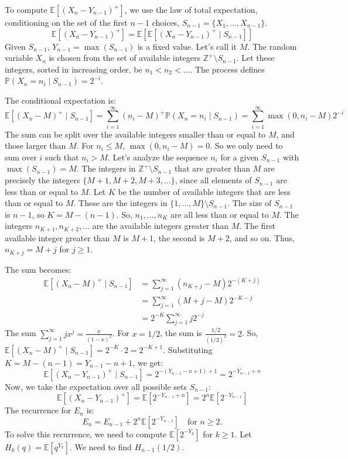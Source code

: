\documentclass[12pt,a4paper]{article}
\theoremstyle{definition}
\begin{document}
    To compute $\mathbb{E}[(X_n - Y_{n-1})^+]$, we use the law of total expectation, conditioning on the set of the first $n-1$ choices, $S_{n-1} = \{X_1, \dots, X_{n-1}\}$.
    \[ \mathbb{E}[(X_n - Y_{n-1})^+] = \mathbb{E}\left[ \mathbb{E}[(X_n - Y_{n-1})^+ \mid S_{n-1}] \right] \]
    Given $S_{n-1}$, $Y_{n-1} = \max(S_{n-1})$ is a fixed value. Let's call it $M$.
    The random variable $X_n$ is chosen from the set of available integers $\mathbb{Z}^+ \setminus S_{n-1}$. Let these integers, sorted in increasing order, be $n_1 < n_2 < \dots$. The process defines $\mathbb{P}(X_n = n_i \mid S_{n-1}) = 2^{-i}$.

    The conditional expectation is:
    \[ \mathbb{E}[(X_n - M)^+ \mid S_{n-1}] = \sum_{i=1}^{\infty} (n_i - M)^+ \mathbb{P}(X_n = n_i \mid S_{n-1}) = \sum_{i=1}^{\infty} \max(0, n_i - M) 2^{-i} \]
    The sum can be split over the available integers smaller than or equal to $M$, and those larger than $M$. For $n_i \leq M$, $\max(0, n_i-M)=0$. So we only need to sum over $i$ such that $n_i > M$.
    Let's analyze the sequence $n_i$ for a given $S_{n-1}$ with $\max(S_{n-1}) = M$. The integers in $\mathbb{Z}^+ \setminus S_{n-1}$ that are greater than $M$ are precisely the integers $\{M+1, M+2, M+3, \dots\}$, since all elements of $S_{n-1}$ are less than or equal to $M$.
    Let $K$ be the number of available integers that are less than or equal to $M$. These are the integers in $\{1, \dots, M\} \setminus S_{n-1}$. The size of $S_{n-1}$ is $n-1$, so $K = M - (n-1)$.
    So, $n_1, \dots, n_K$ are all less than or equal to $M$.
    The integers $n_{K+1}, n_{K+2}, \dots$ are the available integers greater than $M$. The first available integer greater than $M$ is $M+1$, the second is $M+2$, and so on. Thus, $n_{K+j} = M+j$ for $j \geq 1$.

    The sum becomes:
    \begin{align}
        \mathbb{E}[(X_n - M)^+ \mid S_{n-1}] &= \sum_{j=1}^{\infty} (n_{K+j} - M) 2^{-(K+j)} \\
        &= \sum_{j=1}^{\infty} (M+j - M) 2^{-K-j} \\
        &= 2^{-K} \sum_{j=1}^{\infty} j 2^{-j}
    \end{align}
    The sum $\sum_{j=1}^{\infty} jx^j = \frac{x}{(1-x)^2}$. For $x=1/2$, the sum is $\frac{1/2}{(1/2)^2} = 2$.
    So, $\mathbb{E}[(X_n - M)^+ \mid S_{n-1}] = 2^{-K} \cdot 2 = 2^{-K+1}$.
    Substituting $K = M - (n-1) = Y_{n-1} - n + 1$, we get:
    \[ \mathbb{E}[(X_n - Y_{n-1})^+ \mid S_{n-1}] = 2^{-(Y_{n-1}-n+1)+1} = 2^{-Y_{n-1}+n} \]
    Now, we take the expectation over all possible sets $S_{n-1}$:
    \[ \mathbb{E}[(X_n - Y_{n-1})^+] = \mathbb{E}[2^{-Y_{n-1}+n}] = 2^n \mathbb{E}[2^{-Y_{n-1}}] \]
    The recurrence for $E_n$ is:
    \[ E_n = E_{n-1} + 2^n \mathbb{E}[2^{-Y_{n-1}}] \quad \text{for } n \geq 2. \]
    To solve this recurrence, we need to compute $\mathbb{E}[2^{-Y_k}]$ for $k \geq 1$. Let $H_k(q) = \mathbb{E}[q^{Y_k}]$. We need to find $H_{n-1}(1/2)$.
\end{document}
